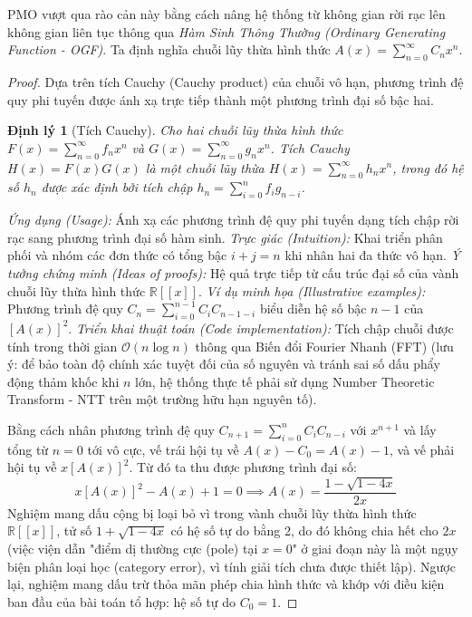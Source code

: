 \documentclass{article}
\newtheorem{dinhly}{Định lý}
\begin{document}
PMO vượt qua rào cản này bằng cách nâng hệ thống từ không gian rời rạc lên không gian liên tục thông qua \textit{Hàm Sinh Thông Thường (Ordinary Generating Function - OGF)}. Ta định nghĩa chuỗi lũy thừa hình thức $A(x) = \sum_{n=0}^{\infty} C_n x^n$.
\begin{proof}
Dựa trên tích Cauchy (Cauchy product) của chuỗi vô hạn, phương trình đệ quy phi tuyến được ánh xạ trực tiếp thành một phương trình đại số bậc hai.

\begin{dinhly}[Tích Cauchy]
Cho hai chuỗi lũy thừa hình thức $F(x) = \sum_{n=0}^{\infty} f_n x^n$ và $G(x) = \sum_{n=0}^{\infty} g_n x^n$. Tích Cauchy $H(x) = F(x)G(x)$ là một chuỗi lũy thừa $H(x) = \sum_{n=0}^{\infty} h_n x^n$, trong đó hệ số $h_n$ được xác định bởi tích chập $h_n = \sum_{i=0}^{n} f_i g_{n-i}$.
\end{dinhly}
\emph{Ứng dụng (Usage):} Ánh xạ các phương trình đệ quy phi tuyến dạng tích chập rời rạc sang phương trình đại số hàm sinh.
\emph{Trực giác (Intuition):} Khai triển phân phối và nhóm các đơn thức có tổng bậc $i+j=n$ khi nhân hai đa thức vô hạn.
\emph{Ý tưởng chứng minh (Ideas of proofs):} Hệ quả trực tiếp từ cấu trúc đại số của vành chuỗi lũy thừa hình thức $\mathbb{R}[[x]]$.
\emph{Ví dụ minh họa (Illustrative examples):} Phương trình đệ quy $C_n = \sum_{i=0}^{n-1} C_i C_{n-1-i}$ biểu diễn hệ số bậc $n-1$ của $[A(x)]^2$.
\emph{Triển khai thuật toán (Code implementation):} Tích chập chuỗi được tính trong thời gian $\mathcal{O}(n \log n)$ thông qua Biến đổi Fourier Nhanh (FFT) (lưu ý: để bảo toàn độ chính xác tuyệt đối của số nguyên và tránh sai số dấu phẩy động thảm khốc khi $n$ lớn, hệ thống thực tế phải sử dụng Number Theoretic Transform - NTT trên một trường hữu hạn nguyên tố).

Bằng cách nhân phương trình đệ quy $C_{n+1} = \sum_{i=0}^{n} C_i C_{n-i}$ với $x^{n+1}$ và lấy tổng từ $n=0$ tới vô cực, vế trái hội tụ về $A(x) - C_0 = A(x) - 1$, và vế phải hội tụ về $x [A(x)]^2$. Từ đó ta thu được phương trình đại số:
\begin{equation*}
 x [A(x)]^2 - A(x) + 1 = 0 \implies A(x) = \frac{1 - \sqrt{1-4x}}{2x}
\end{equation*}
Nghiệm mang dấu cộng bị loại bỏ vì trong vành chuỗi lũy thừa hình thức $\mathbb{R}[[x]]$, tử số $1 + \sqrt{1-4x}$ có hệ số tự do bằng 2, do đó không chia hết cho $2x$ (việc viện dẫn "điểm dị thường cực (pole) tại $x=0$" ở giai đoạn này là một ngụy biện phân loại học (category error), vì tính giải tích chưa được thiết lập). Ngược lại, nghiệm mang dấu trừ thỏa mãn phép chia hình thức và khớp với điều kiện ban đầu của bài toán tổ hợp: hệ số tự do $C_0 = 1$.


\end{proof}
\end{document}
